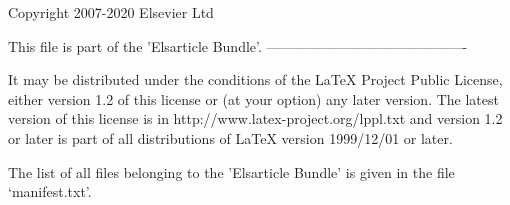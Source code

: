 

\preamble

Copyright 2007-2020 Elsevier Ltd

This file is part of the 'Elsarticle Bundle'.
-------------------------------------------

It may be distributed under the conditions of the LaTeX Project Public
License, either version 1.2 of this license or (at your option) any
later version.  The latest version of this license is in
   http://www.latex-project.org/lppl.txt
and version 1.2 or later is part of all distributions of LaTeX
version 1999/12/01 or later.

The list of all files belonging to the 'Elsarticle Bundle' is
given in the file `manifest.txt'.

\endpreamble

\askforoverwritefalse

\obeyspaces
\Msg{*************************************************************}
\Msg{*                                                           *}
\Msg{*                                                           *}
\Msg{*                                                           *}
\Msg{*                                                           *}
\Msg{*                                                           *}
\Msg{*************************************************************}

\endbatchfile